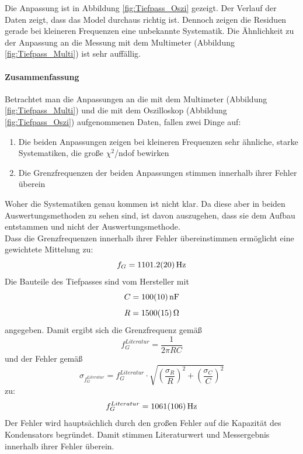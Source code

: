 \documentclass[12pt,a4paper]{article}
\begin{document}
Die Anpassung ist in Abbildung \ref{fig:Tiefpass_Oszi} gezeigt. Der Verlauf der Daten zeigt, dass das Model durchaus richtig ist. Dennoch zeigen die Residuen gerade bei kleineren Frequenzen eine unbekannte Systematik. Die Ähnlichkeit zu der Anpassung an die Messung mit dem Multimeter (Abbildung \ref{fig:Tiefpass_Multi}) ist sehr auffällig.

\paragraph{Zusammenfassung}
Betrachtet man die Anpassungen an die mit dem Multimeter (Abbildung \ref{fig:Tiefpass_Multi}) und die mit dem Oszilloskop (Abbildung \ref{fig:Tiefpass_Oszi}) aufgenommenen Daten, fallen zwei Dinge auf:
\begin{enumerate}
\item Die beiden Anpassungen zeigen bei kleineren Frequenzen sehr ähnliche, starke Systematiken, die große $\chi ^2$/ndof bewirken
\item Die Grenzfrequenzen der beiden Anpassungen stimmen innerhalb ihrer Fehler überein
\end{enumerate}
Woher die Systematiken genau kommen ist nicht klar. Da diese aber in beiden Auswertungsmethoden zu sehen sind, ist davon auszugehen, dass sie dem Aufbau entstammen und nicht der Auswertungsmethode. \\
Dass die Grenzfrequenzen innerhalb ihrer Fehler übereinstimmen ermöglicht eine gewichtete Mittelung zu:
\begin{equation*}
f_G = \SI{1101,2 \pm 2,0}{Hz}
\end{equation*}
Die Bauteile des Tiefpasses sind vom Hersteller mit
\begin{equation*}
C = \SI{100 \pm 10}{nF}
\end{equation*}
\begin{equation*}
R = \SI{1500 \pm 15}{\Omega}
\end{equation*}
angegeben. Damit ergibt sich die Grenzfrequenz gemäß
\begin{equation*}
f_G^{Literatur} = \dfrac{1}{2 \pi RC}
\end{equation*}
und der Fehler gemäß
\begin{equation*}
\sigma _{f_G^{Literatur}} = f_G^{Literatur} \cdot \sqrt{\left( \dfrac{\sigma _R}{R} \right) ^2 + \left( \dfrac{\sigma _C}{C} \right) ^2}
\end{equation*}
zu:
\begin{equation*}
f_G^{Literatur} = \SI{1061 \pm 106}{Hz}
\end{equation*}
Der Fehler wird hauptsächlich durch den großen Fehler auf die Kapazität des Kondensators begründet. Damit stimmen Literaturwert und Messergebnis innerhalb ihrer Fehler überein.
\end{document}
